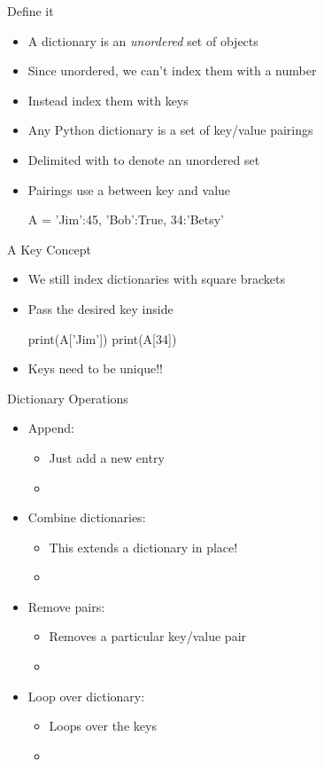 \documentclass[pdf, aspectratio=169, 12pt]{beamer}
\begin{document}
\begin{frame}[fragile]{Define it}
	\begin{itemize}
		\item A \alert{dictionary} is an \emph{unordered} set of objects
		\item Since unordered, we can't index them with a number
		\item Instead index them with \alert{keys}
		\item Any Python dictionary is a set of key/value pairings
		\item Delimited with \pyi{\{\}} to denote an unordered set
		\item Pairings use a \pyi{:} between key and value
			\begin{pythoncode}
				A = {'Jim':45, 'Bob':True, 34:'Betsy'}
			\end{pythoncode}
	\end{itemize}
\end{frame}

\begin{frame}[fragile]{A Key Concept}
	\begin{itemize}
		\item We still index dictionaries with square brackets
		\item Pass the desired \alert{key} inside
			\begin{pythoncode}
				print(A['Jim'])
				print(A[34])
			\end{pythoncode}
		\item Keys need to be unique!!
	\end{itemize}
\end{frame}

\begin{frame}{Dictionary Operations}
	\begin{itemize}
		\item Append:
			\begin{itemize}
				\item Just add a new entry
				\item {}
			\end{itemize}
		\item Combine dictionaries:
			\begin{itemize}
				\item This extends a dictionary in place!
				\item {}
			\end{itemize}
		\item Remove pairs:
			\begin{itemize}
				\item Removes a particular key/value pair
				\item {}
			\end{itemize}
		\item Loop over dictionary:
			\begin{itemize}
				\item Loops over the \alert{keys}
				\item {}
			\end{itemize}
	\end{itemize}
\end{frame}
\end{document}
